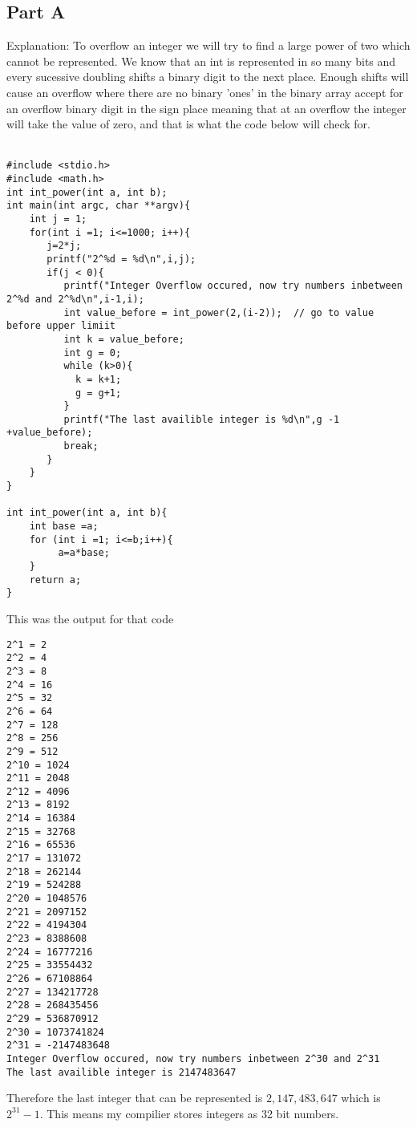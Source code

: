 \documentclass[12pt]{article}
\begin{document}
\subsection{Part A}
Explanation: To overflow an integer we will try to find a large power of two which cannot be represented. We know that an int is represented in so many bits and every sucessive doubling shifts a binary digit to the next place. Enough shifts will cause an overflow where there are no binary 'ones' in the binary array accept for an overflow binary digit in the sign place meaning that at an overflow the integer will take the value of zero, and that is what the code below will check for.
\\
\\
\begin{verbatim}
#include <stdio.h>
#include <math.h>
int int_power(int a, int b);
int main(int argc, char **argv){
    int j = 1;
    for(int i =1; i<=1000; i++){
       j=2*j;
       printf("2^%d = %d\n",i,j);
       if(j < 0){
       	  printf("Integer Overflow occured, now try numbers inbetween 2^%d and 2^%d\n",i-1,i);
       	  int value_before = int_power(2,(i-2));  // go to value before upper limiit
       	  int k = value_before;
       	  int g = 0;
       	  while (k>0){
       	  	k = k+1;
       	  	g = g+1;
       	  }
       	  printf("The last availible integer is %d\n",g -1 +value_before);
       	  break;
       }
    }
}

int int_power(int a, int b){
	int base =a;
	for (int i =1; i<=b;i++){
		 a=a*base;
	}
	return a;
}
\end{verbatim}
This was the output for that code
\begin{verbatim}
2^1 = 2
2^2 = 4
2^3 = 8
2^4 = 16
2^5 = 32
2^6 = 64
2^7 = 128
2^8 = 256
2^9 = 512
2^10 = 1024
2^11 = 2048
2^12 = 4096
2^13 = 8192
2^14 = 16384
2^15 = 32768
2^16 = 65536
2^17 = 131072
2^18 = 262144
2^19 = 524288
2^20 = 1048576
2^21 = 2097152
2^22 = 4194304
2^23 = 8388608
2^24 = 16777216
2^25 = 33554432
2^26 = 67108864
2^27 = 134217728
2^28 = 268435456
2^29 = 536870912
2^30 = 1073741824
2^31 = -2147483648
Integer Overflow occured, now try numbers inbetween 2^30 and 2^31
The last availible integer is 2147483647
\end{verbatim}

Therefore the last integer that can be represented is $2,147,483,647$ which is $2^31 -1$. This means my compilier stores integers as 32 bit numbers.
\end{document}
